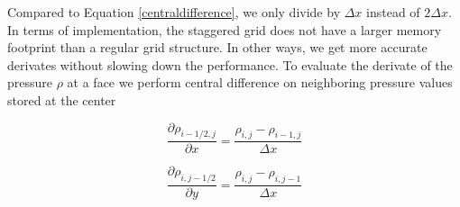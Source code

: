Compared to Equation \ref{centraldifference}, we only divide by $\Delta x$ instead of $2\Delta x$. In terms of implementation, the staggered grid does not have a larger memory footprint than a regular grid structure. In other ways, we get more accurate derivates without slowing down the performance. To evaluate the derivate of the pressure $\rho$ at a face we perform central difference on neighboring pressure values stored at the center

\begin{equation}
\frac{\partial \rho_{i-1/2,j}}{\partial x} = \frac{\rho_{i,j} - \rho_{i-1,j}}{\Delta x}
\end{equation}

\begin{equation}
\frac{\partial \rho_{i,j-1/2}}{\partial y} = \frac{\rho_{i,j} - \rho_{i,j-1}}{\Delta x}
\end{equation}
